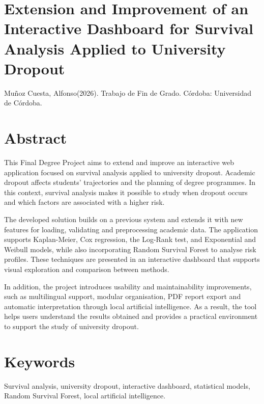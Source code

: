 \section*{Extension and Improvement of an Interactive Dashboard for Survival Analysis Applied to University Dropout}

\noindent
Muñoz Cuesta, Alfonso(2026). Trabajo de Fin de Grado. Córdoba: Universidad de Córdoba.
\section*{Abstract}
This Final Degree Project aims to extend and improve an interactive web application focused on survival analysis applied to university dropout. Academic dropout affects students' trajectories and the planning of degree programmes. In this context, survival analysis makes it possible to study when dropout occurs and which factors are associated with a higher risk.

The developed solution builds on a previous system and extends it with new features for loading, validating and preprocessing academic data. The application supports Kaplan-Meier, Cox regression, the Log-Rank test, and Exponential and Weibull models, while also incorporating Random Survival Forest to analyse risk profiles. These techniques are presented in an interactive dashboard that supports visual exploration and comparison between methods.

In addition, the project introduces usability and maintainability improvements, such as multilingual support, modular organisation, PDF report export and automatic interpretation through local artificial intelligence. As a result, the tool helps users understand the results obtained and provides a practical environment to support the study of university dropout.

\section*{Keywords}
Survival analysis, university dropout, interactive dashboard, statistical models, Random Survival Forest, local artificial intelligence.
